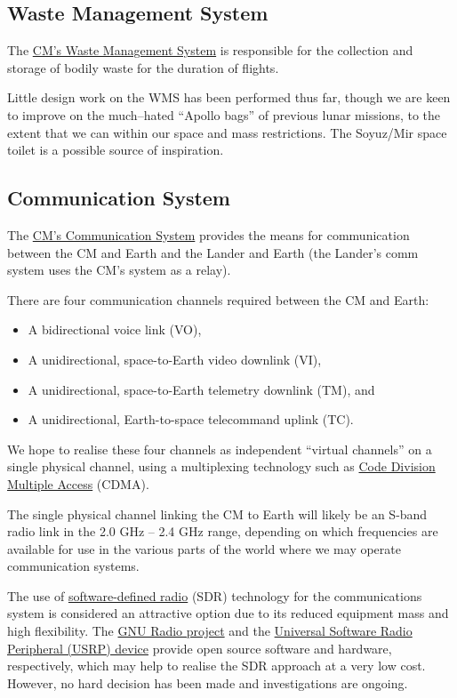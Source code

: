 \documentclass{report}
\begin{document}
\subsection{Waste Management System}

The \href{http://cstart.org/wiki/CLLARE_Waste_Management_System}{CM's Waste Management System} is responsible for the collection and storage of bodily waste for the duration of flights.

Little design work on the WMS has been performed thus far, though we are keen to improve on the much--hated ``Apollo bags'' of previous lunar missions, to the extent that we can within our space and mass restrictions.  The Soyuz/Mir space toilet is a possible source of inspiration.

\subsection{Communication System}

The \href{http://cstart.org/wiki/CLLARE_CM_Communication_System}{CM's Communication System} provides the means for communication between the CM and Earth and the Lander and Earth (the Lander's comm system uses the CM's system as a relay).

There are four communication channels required between the CM and Earth:
\begin{itemize}
\item A bidirectional voice link (VO),
\item A unidirectional, space-to-Earth video downlink (VI),
\item A unidirectional, space-to-Earth telemetry downlink (TM), and
\item A unidirectional, Earth-to-space telecommand uplink (TC).
\end{itemize}
We hope to realise these four channels as independent ``virtual channels'' on a single physical channel, using a multiplexing technology such as \href{http://en.wikipedia.org/wiki/Code_division_multiple_access}{Code Division Multiple Access} (CDMA).

The single physical channel linking the CM to Earth will likely be an S-band radio link in the 2.0 GHz -- 2.4 GHz range, depending on which frequencies are available for use in the various parts of the world where we may operate communication systems.

The use of \href{http://en.wikipedia.org/wiki/Software_defined_radio}{software-defined radio} (SDR) technology for the communications system is considered an attractive option due to its reduced equipment mass and high flexibility.  The \href{http://gnuradio.org/redmine/wiki/gnuradio}{GNU Radio project} and the \href{http://www.ettus.com/products}{Universal Software Radio Peripheral (USRP) device} provide open source software and hardware, respectively, which may help to realise the SDR approach at a very low cost.  However, no hard decision has been made and investigations are ongoing.
\end{document}
